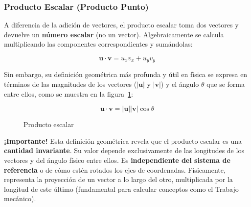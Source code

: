 \documentclass[11pt,a4paper]{book}
\begin{document}
\subsubsection{Producto Escalar (Producto Punto)}
A diferencia de la adición de vectores, el producto escalar toma dos vectores y devuelve un \textbf{número escalar} (no un vector). Algebraicamente se calcula multiplicando las componentes correspondientes y sumándolas:

\begin{equation}
    \boldsymbol{u} \cdot \boldsymbol{v} = u_x v_x + u_y v_y
\end{equation}

Sin embargo, su definición geométrica más profunda y útil en física se expresa en términos de las magnitudes de los vectores ($|\boldsymbol{u}|$ y $|\boldsymbol{v}|$) y el ángulo $\theta$ que se forma entre ellos, como se muestra en la figura~\ref{fig:dotproduct}:

\begin{equation}
    \boldsymbol{u} \cdot \boldsymbol{v} = |\boldsymbol{u}| |\boldsymbol{v}| \cos\theta
\end{equation}

\begin{figure}[H]
    \centering
{}
    
    \caption{Producto escalar}
    \label{fig:dotproduct}
\end{figure}


\textbf{¡Importante!} Esta definición geométrica revela que el producto escalar es una \textbf{cantidad invariante}. Su valor depende exclusivamente de las longitudes de los vectores y del ángulo físico entre ellos. Es \textbf{independiente del sistema de referencia} o de cómo estén rotados los ejes de coordenadas. Físicamente, representa la proyección de un vector a lo largo del otro, multiplicada por la longitud de este último (fundamental para calcular conceptos como el Trabajo mecánico).
\end{document}
